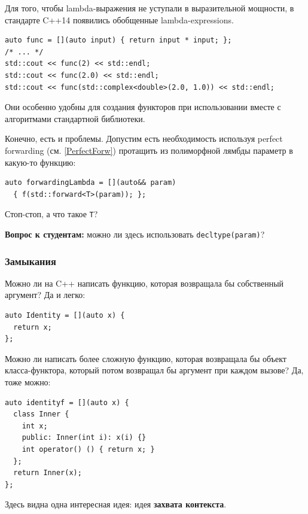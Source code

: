 \documentclass[a4paper,12pt,oneside]{article}
\newif\ifanswers
\begin{document}
Для того, чтобы lambda-выражения не уступали в выразительной мощности, в стандарте C++14 появились обобщенные lambda-expressions.

\begin{lstlisting}
auto func = [](auto input) { return input * input; };
/* ... */
std::cout << func(2) << std::endl;
std::cout << func(2.0) << std::endl;
std::cout << func(std::complex<double>(2.0, 1.0)) << std::endl;
\end{lstlisting}

Они особенно удобны для создания функторов при использовании вместе с алгоритмами стандартной библиотеки.

Конечно, есть и проблемы. Допустим есть необходимость используя perfect forwarding (см. \ref{PerfectForw}) протащить из полиморфной лямбды параметр в какую-то функцию:

\begin{lstlisting}
auto forwardingLambda = [](auto&& param) 
  { f(std::forward<T>(param)); };
\end{lstlisting}

Стоп-стоп, а что такое \lstinline!T!?

\textbf{Вопрос к студентам:} можно ли здесь использовать \lstinline!decltype(param)!?

\ifanswers
Правильный ответ: конечно можно. Даже нужно.
\fi

\subsubsection{Замыкания}

Можно ли на C++ написать функцию, которая возвращала бы собственный аргумент? Да и легко:

\begin{lstlisting}
auto Identity = [](auto x) {
  return x;
};
\end{lstlisting}

Можно ли написать более сложную функцию, которая возвращала бы объект класса-функтора, который потом возвращал бы аргумент при каждом вызове? Да, тоже можно:

\begin{lstlisting}
auto identityf = [](auto x) {
  class Inner {
    int x;
    public: Inner(int i): x(i) {}
    int operator() () { return x; }
  };
  return Inner(x);
};
\end{lstlisting}

Здесь видна одна интересная идея: идея \textbf{захвата контекста}. 
\end{document}

